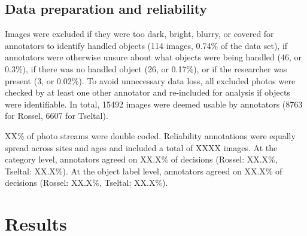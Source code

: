 \documentclass[10pt, letterpaper]{article}
\begin{document}
\hypertarget{data-preparation-and-reliability}{%
\subsection{Data preparation and
reliability}\label{data-preparation-and-reliability}}

Images were excluded if they were too dark, bright, blurry, or covered
for annotators to identify handled objects (114 images, 0.74\% of the
data set), if annotators were otherwise unsure about what objects were
being handled (46, or 0.3\%), if there was no handled object (26, or
0.17\%), or if the researcher was present (3, or 0.02\%). To avoid
unnecessary data loss, all excluded photos were checked by at least one
other annotator and re-included for analysis if objects were
identifiable. In total, 15492 images were deemed usable by annotators
(8763 for Rossel, 6607 for Tseltal).

XX\% of photo streams were double coded. Reliability annotations were
equally spread across sites and ages and included a total of XXXX
images. At the category level, annotators agreed on XX.X\% of decisions
(Rossel: XX.X\%, Tseltal: XX.X\%). At the object label level, annotators
agreed on XX.X\% of decisions (Rossel: XX.X\%, Tseltal: XX.X\%).

\begin{table}[!ht]
\centering
{}
\caption{Non-study-related objects handled by the most children across categories and sites.} 
\label{tab:top-objects}
\end{table}

\hypertarget{results}{%
\section{Results}\label{results}}
\end{document}
